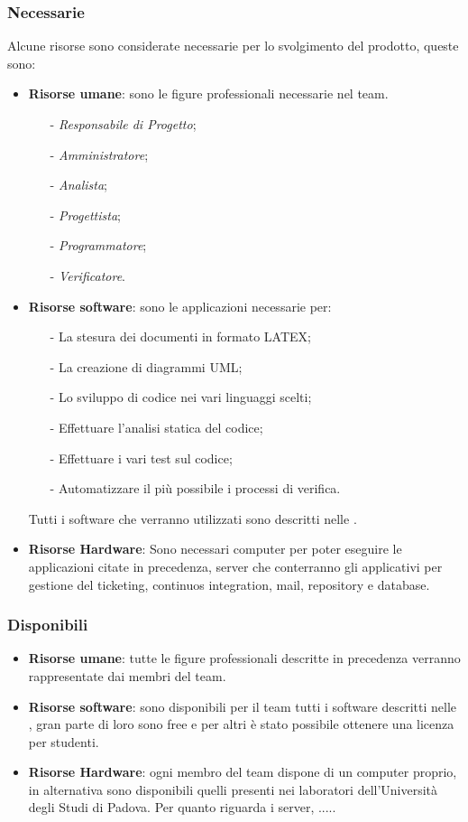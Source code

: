 \subsubsection{Necessarie}
Alcune risorse sono considerate necessarie per lo svolgimento del prodotto, queste sono:
\begin{itemize}
\item \textbf{Risorse umane}: sono le figure professionali necessarie nel team.
\begin{itemize}
\item[-] \textit{Responsabile di Progetto};
\item[-] \textit{Amministratore};
\item[-] \textit{Analista};
\item[-] \textit{Progettista};
\item[-] \textit{Programmatore};
\item[-] \textit{Verificatore}.
\end{itemize}
\item \textbf{Risorse software}: sono le applicazioni necessarie per:
\begin{itemize}
\item[-] La stesura dei documenti in formato LATEX; 
\item[-] La creazione di diagrammi UML;
\item[-] Lo sviluppo di codice nei vari linguaggi scelti;
\item[-] Effettuare l'analisi statica del codice;
\item[-] Effettuare i vari test sul codice;
\item[-] Automatizzare il più possibile i processi di verifica.
\end{itemize}
Tutti i software che verranno utilizzati sono descritti nelle \textit{\NdP}.
\item \textbf{Risorse Hardware}: Sono necessari computer per poter eseguire le applicazioni citate in precedenza, server che conterranno gli applicativi per gestione del ticketing, continuos integration, mail, repository e database.
\end{itemize}

\subsubsection{Disponibili}
\begin{itemize}
\item \textbf{Risorse umane}: tutte le figure professionali descritte in precedenza verranno rappresentate dai membri del team.
\item \textbf{Risorse software}: sono disponibili per il team tutti i software descritti nelle \textit{\NdP}, gran parte di loro sono free e per altri è stato possibile ottenere una licenza per studenti.
\item \textbf{Risorse Hardware}: ogni membro del team dispone di un computer proprio, in alternativa sono disponibili quelli presenti nei laboratori dell’Università degli Studi di Padova. Per quanto riguarda i server, ..... 
\end{itemize}


